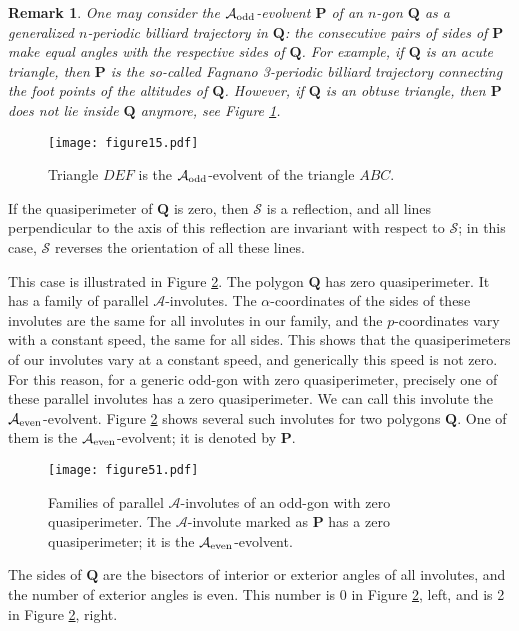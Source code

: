 \documentclass[12pt]{article}
\newtheorem{remark}[lemma]{Remark}
\newcommand{\Aev}{\mathcal{A}}
\renewcommand{\P}{\mathbf{P}}
\begin{document}
\begin{remark} \label{bill}
{\rm
One may consider the $\Aev_{\rm odd}$-evolvent $\P$ of an $n$-gon $\mathbf Q$ as a generalized $n$-periodic billiard trajectory in $\mathbf Q$: the consecutive pairs of sides of $\P$ make equal angles with the respective sides of $\mathbf Q$. For example, if $\mathbf Q$ is an acute triangle, then $\P$ is the so-called Fagnano 3-periodic billiard trajectory connecting the foot points of the altitudes of $\mathbf Q$. However, if $\mathbf Q$ is an obtuse triangle, then $\P$ does not lie inside $\mathbf Q$ anymore, see Figure \ref{pedal}.
}
\end{remark}

\begin{figure}[hbtp]
\centering
\texttt{[image: figure15.pdf]} 
\caption{Triangle $DEF$ is the $\Aev_{\rm odd}$-evolvent of the triangle $ABC$.}
\label{pedal}
\end{figure}

If the quasiperimeter of $\mathbf Q$ is zero, then $\mathcal S$ is a reflection, and all lines perpendicular to the axis of this reflection are invariant with respect to $\mathcal S$; in this case, $\mathcal S$ reverses the orientation of all these lines.

This case is illustrated in Figure \ref{anglevoleven}. The polygon $\mathbf Q$ has  zero quasi\-perimeter. It has a family of parallel $\Aev$-involutes. The  $\alpha$-coordinates of the sides of these involutes are the same for all involutes in our family, and the  $p$-coordinates vary with a constant speed,  the same for all sides. This shows that the quasiperimeters of our involutes vary at a constant speed, and generically this speed is not zero. For this reason, for a generic odd-gon with  zero quasiperimeter, precisely one of these parallel involutes has a zero quasiperimeter. We can call this involute the $\Aev_{\rm even}$-evolvent. Figure \ref{anglevoleven} shows several such involutes for two polygons $\mathbf Q$. One of them is the $\Aev_{\rm even}$-evolvent; it is denoted by $\P$. 

\begin{figure}[htbp]
\centering
\texttt{[image: figure51.pdf]}
\caption{Families of parallel $\Aev$-involutes of an odd-gon with zero quasiperimeter. The $\Aev$-involute marked as $\P$ has a zero quasiperimeter; it is the $\Aev_{\rm even}$-evolvent.}
\label{anglevoleven}
\end{figure}

The sides of $\mathbf Q$ are the bisectors of interior or exterior angles of all involutes, and the number of exterior angles is even. This number is 0 in Figure \ref{anglevoleven}, left, and is 2 in Figure \ref{anglevoleven}, right.
\end{document}
